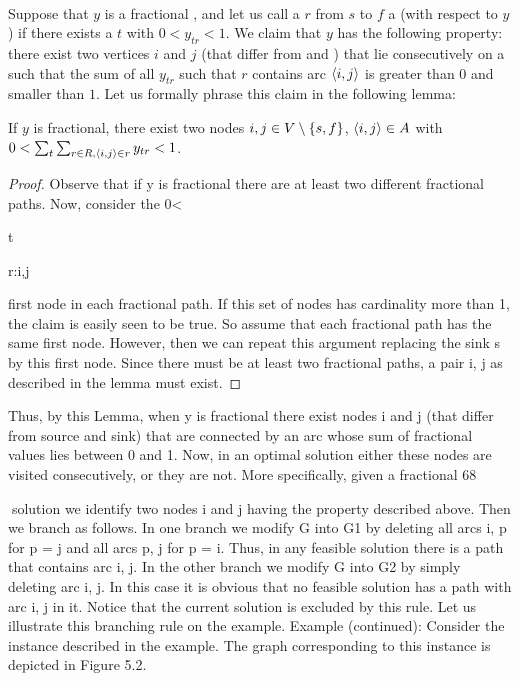\paragraph{}
Suppose that $y$ is a fractional , and let us call a  $r$ from $s$ to $f$ a  (with respect to $y$) if there exists a $t$ with $0<y_{tr}<1$. We claim that $y$ has the following property: there exist two vertices $i$ and $j$ (that differ from  and ) that lie consecutively on a  such that the sum of all $y_{tr}$ such that $r$ contains arc $\left\langle i,j \right\rangle$ is greater than $0$ and smaller than $1$. Let us formally phrase this claim in the following lemma:

\begin{lemma}
If $y$ is fractional, there exist two nodes $i,j\in V\setminus\left\{ s,f \right\}$, $\left\langle i,j \right\rangle\in A$ with $0<\sum_t{\sum_{r\in R,\left\langle i,j \right\rangle\in r}y_{tr}}<1$.

\begin{proof}
Observe that if y is fractional there are at least two different fractional paths. Now, consider the
0<

t

r:{i,j}

first node in each fractional path. If this set of nodes has cardinality more than 1, the claim is easily seen
to be true. So assume that each fractional path has the same first node. However, then we can repeat
this argument replacing the sink s by this first node. Since there must be at least two fractional paths,
a pair i, j as described in the lemma must exist.
\end{proof}
\end{lemma}

Thus, by this Lemma, when y is fractional there exist nodes i and j (that differ from source and sink)
that are connected by an arc whose sum of fractional values lies between 0 and 1. Now, in an optimal
solution either these nodes are visited consecutively, or they are not. More specifically, given a fractional
68

solution we identify two nodes i and j having the property described above. Then we branch as follows.
In one branch we modify G into G1 by deleting all arcs {i, p} for p = j and all arcs {p, j} for p = i. Thus,
in any feasible solution there is a path that contains arc {i, j}. In the other branch we modify G into G2
by simply deleting arc {i, j}. In this case it is obvious that no feasible solution has a path with arc {i, j}
in it. Notice that the current solution is excluded by this rule. Let us illustrate this branching rule on
the example.
Example (continued): Consider the instance described in the example. The graph corresponding to
this instance is depicted in Figure 5.2.


